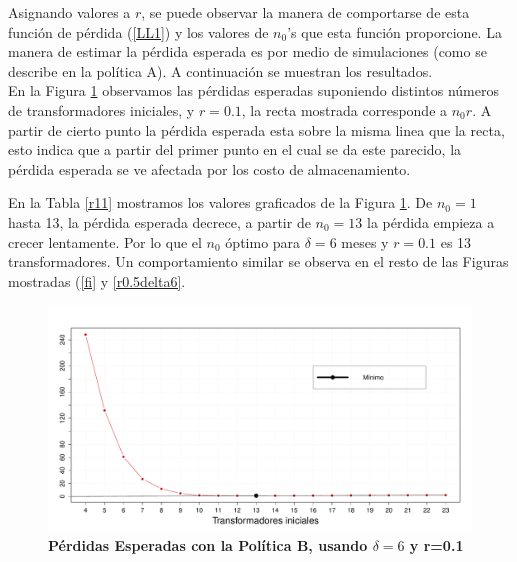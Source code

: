 \noindent Asignando valores a $r$, se puede observar la manera de comportarse de esta funci\'on de p\'erdida  (\ref{LL1}) y los valores de $n_0$'s que esta funci\'on proporcione. La manera de estimar la p\'erdida esperada es por medio de simulaciones (como se describe en la pol\'itica A). 
A continuaci\'on se muestran los resultados.\\[.2cm]
\noindent En la Figura \ref{u01p6} observamos las p\'erdidas esperadas suponiendo distintos n\'umeros de transformadores iniciales, y $r=0.1$, la recta mostrada corresponde a $n_0r$. A partir de cierto punto la p\'erdida esperada esta sobre la misma linea que la recta, esto indica que a partir del primer punto en el cual se da este parecido, la p\'erdida esperada se ve afectada por los costo de almacenamiento. 


\noindent En la Tabla \ref{r11} mostramos los valores graficados de la Figura \ref{u01p6}. De $n_0=1$ hasta 13, la p\'erdida esperada decrece, a partir de $n_0=13$ la p\'erdida empieza a crecer lentamente. Por lo que el $n_0$ \'optimo para $\delta=6$ meses y $r=0.1$ es 13 transformadores. Un comportamiento similar se observa en el resto de las Figuras mostradas (\ref{fi} y \ref{r0.5delta6}.

\begin{figure}[h!]
\begin{center}
\includegraphics[scale=0.3]{utilpeso01delta61.pdf}
\end{center}
\vspace{-1 cm}\caption{\bf P\'erdidas Esperadas con la Pol\'itica B, usando $\delta=6$ y r=0.1}\label{u01p6}
\end{figure}

